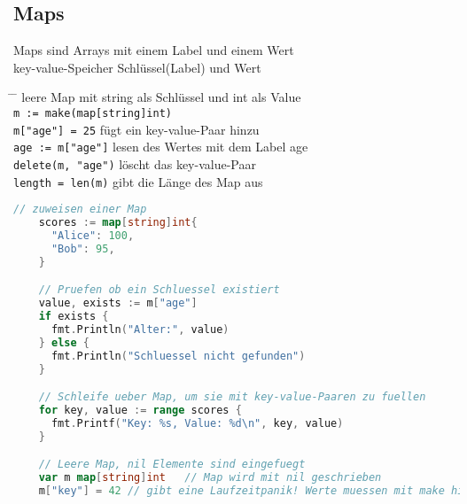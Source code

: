 \documentclass[twoside,a4paper,12pt]{article}
\begin{document}
\subsection{Maps}
Maps sind Arrays mit einem Label und einem Wert \\
key-value-Speicher Schlüssel(Label) und Wert 
\begin{tabbing}
 \hspace{2mm} \= \hspace{50mm} \= \kill
  \> leere Map mit string als Schlüssel und int als Value \\ 
 \> \verb|m := make(map[string]int)| \\ 
 \> \verb|m["age"] = 25| \> fügt ein key-value-Paar hinzu \\ 
 \> \verb|age := m["age"]| \> lesen des Wertes mit dem Label age \\ 
 \> \verb|delete(m, "age")| \> löscht das key-value-Paar \\ 
 \> \verb|length = len(m)| \> gibt die Länge des Map aus \\ 
\end{tabbing}
\begin{center}
  \begin{minipage}{1.0\textwidth}
    \begin{lstlisting}[language=Go]
    // zuweisen einer Map
    scores := map[string]int{ 
      "Alice": 100,
      "Bob": 95,
    }

    // Pruefen ob ein Schluessel existiert
    value, exists := m["age"]
    if exists {
      fmt.Println("Alter:", value)
    } else {
      fmt.Println("Schluessel nicht gefunden")
    }

    // Schleife ueber Map, um sie mit key-value-Paaren zu fuellen
    for key, value := range scores {
      fmt.Printf("Key: %s, Value: %d\n", key, value)
    }

    // Leere Map, nil Elemente sind eingefuegt
    var m map[string]int   // Map wird mit nil geschrieben 
    m["key"] = 42 // gibt eine Laufzeitpanik! Werte muessen mit make hinzugefuegt werden 
    \end{lstlisting}
  \end{minipage}
\end{center}

\newpage
\end{document}
